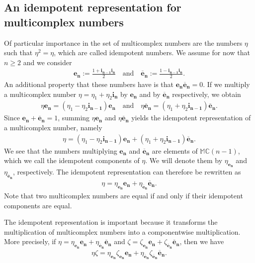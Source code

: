 \documentclass[12pt]{amsart}
\theoremstyle{plain}
\theoremstyle{definition}
\numberwithin{equation}{section}
\newcommand{\im}[1]{\mathbf{ i_{#1}}}
\newcommand{\be}[1]{\mathbf{e_{#1}}}
\newcommand{\bec}[1]{\mathbf{\overline{e}_{#1}}}
\newcommand{\mC}{\mathbb{C}}
\newcommand{\mM}{\mathbb{M}}
\begin{document}
\subsection{An idempotent representation for multicomplex numbers}
Of particular importance in the set of multicomplex numbers are the numbers $\eta$ such that $\eta^2=\eta$, which are called idempotent numbers. We assume for now that $n \geq 2$ and we consider
		\begin{align*}
		\be{n} := \frac{1 + \im{n-1} \im{n}}{2} \quad \text{and} \quad \bec{n} := \frac{1 - \im{n-1} \im{n}}{2} .
		\end{align*}
	An additional property that these numbers have is that $\be{n} \bec{n} = 0$. If we multiply a multicomplex number $\eta = \eta_1 + \eta_2 \im{n}$ by $\be{n}$ and by $\bec{n}$ respectively, we obtain
		\begin{align*}
		\eta \be{n} = (\eta_1 - \eta_2 \im{n-1}) \be{n} \quad \text{and} \quad \eta \bec{n} = (\eta_1 + \eta_2 \im{n - 1} ) \bec{n}.
		\end{align*}
	Since $\be{n} + \bec{n} = 1$, summing $\eta\be{n}$ and $\eta\bec{n}$ yields the idempotent representation of a multicomplex number, namely
		\begin{align*}
		\eta = (\eta_1 - \eta_2 \im{n - 1}) \be{n} + (\eta_1 + \eta_2 \im{n - 1} ) \bec{n} .
		\end{align*}
	We see that the numbers multiplying $\be{n}$ and $\bec{n}$ are elements of $\mM \mC (n - 1 )$, which we call the idempotent components of $\eta$. We will denote them by $\eta_{\be{n}}$ and $\eta_{\bec{n}}$, respectively. The idempotent representation can therefore be rewritten as
		\begin{align}
		\eta = \eta_{\be{n}} \be{n} + \eta_{\bec{n}} \bec{n} . \label{Eq:IdempotentRepresentation}
		\end{align}
  Note that two multicomplex numbers are equal if and only if their idempotent components are equal.
  
		The idempotent representation is important because it transforms the multiplication of multicomplex numbers into a componentwise multiplication. More precisely, if $\eta = \eta_{\be{n}} \be{n} + \eta_{\bec{n}} \bec{n}$ and $\zeta = \zeta_{\be{n}} \be{n} + \zeta_{\bec{n}} \bec{n}$, then we have
		\begin{align}
		\eta \zeta = \eta_{\be{n}} \zeta_{\be{n}} \be{n} + \eta_{\bec{n}} \zeta_{\bec{n}} \bec{n} . \label{Eq:IdempotentMultiplication}
		\end{align}
	
\end{document}
